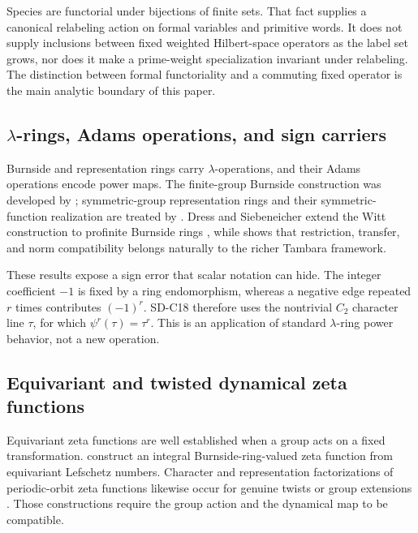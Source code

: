 Species are functorial under bijections of finite sets.  That fact supplies a
canonical relabeling action on formal variables and primitive words.  It does
not supply inclusions between fixed weighted Hilbert-space operators as the
label set grows, nor does it make a prime-weight specialization invariant
under relabeling.  The distinction between formal functoriality and a
commuting fixed operator is the main analytic boundary of this paper.

\subsection{\texorpdfstring{$\lambda$}{lambda}-rings, Adams operations, and sign carriers}

Burnside and representation rings carry $\lambda$-operations, and their
Adams operations encode power maps.  The finite-group Burnside construction
was developed by \citet{Siebeneicher1976LambdaBurnside}; symmetric-group
representation rings and their symmetric-function realization are treated
by \citet{Knutson1973LambdaRings}.  Dress and Siebeneicher extend the Witt
construction to profinite Burnside rings
\citep{DressSiebeneicher1988ProfiniteWitt}, while
\citet{Brun2005WittTambara} shows that restriction, transfer, and norm
compatibility belongs naturally to the richer Tambara framework.

These results expose a sign error that scalar notation can hide.  The
integer coefficient $-1$ is fixed by a ring endomorphism, whereas a negative
edge repeated $r$ times contributes $(-1)^r$.  SD-C18 therefore uses the
nontrivial $C_2$ character line $\tau$, for which
$\psi^r(\tau)=\tau^r$.  This is an application of standard $\lambda$-ring
power behavior, not a new operation.

\subsection{Equivariant and twisted dynamical zeta functions}

Equivariant zeta functions are well established when a group acts on a fixed
transformation.  \citet{GuseinZadeLuengoMelle2015EquivariantZeta} construct
an integral Burnside-ring-valued zeta function from equivariant Lefschetz
numbers.  Character and representation factorizations of periodic-orbit
zeta functions likewise occur for genuine twists or group extensions
\citep{Pollicott1994TwistedOrbits}.  Those constructions require the group
action and the dynamical map to be compatible.

